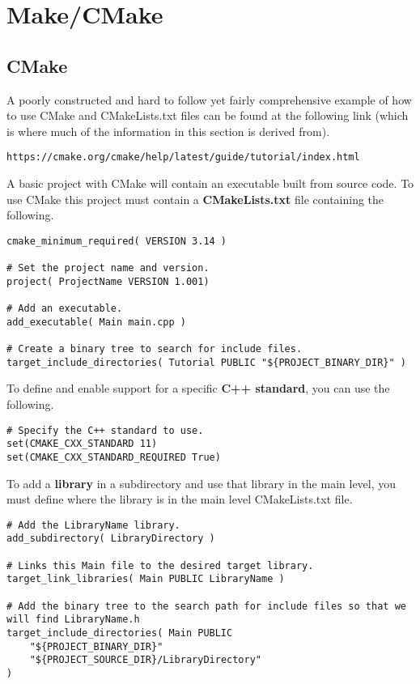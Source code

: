 \chapter{Make/CMake}
\thispagestyle{fancy}
\lstset{language=Bash, style=bash}

\section{CMake}

A poorly constructed and hard to follow yet fairly comprehensive example of how to use CMake and CMakeLists.txt files can be found at the following link (which is where much of the information in this section is derived from).
\begin{lstlisting}
https://cmake.org/cmake/help/latest/guide/tutorial/index.html
\end{lstlisting}

A basic project with CMake will contain an executable built from source code. To use CMake this project must contain a \textbf{CMakeLists.txt} file containing the following.
\begin{lstlisting}
cmake_minimum_required( VERSION 3.14 )

# Set the project name and version.
project( ProjectName VERSION 1.001)

# Add an executable.
add_executable( Main main.cpp )

# Create a binary tree to search for include files.
target_include_directories( Tutorial PUBLIC "${PROJECT_BINARY_DIR}" )
\end{lstlisting}

To define and enable support for a specific \textbf{C++ standard}, you can use the following.
\begin{lstlisting}
# Specify the C++ standard to use.
set(CMAKE_CXX_STANDARD 11)
set(CMAKE_CXX_STANDARD_REQUIRED True)
\end{lstlisting}

To add a \textbf{library} in a subdirectory and use that library in the main level, you must define where the library is in the main level CMakeLists.txt file.
\begin{lstlisting}
# Add the LibraryName library.
add_subdirectory( LibraryDirectory )

# Links this Main file to the desired target library.
target_link_libraries( Main PUBLIC LibraryName )

# Add the binary tree to the search path for include files so that we will find LibraryName.h
target_include_directories( Main PUBLIC
	"${PROJECT_BINARY_DIR}"
	"${PROJECT_SOURCE_DIR}/LibraryDirectory"
)
\end{lstlisting}

